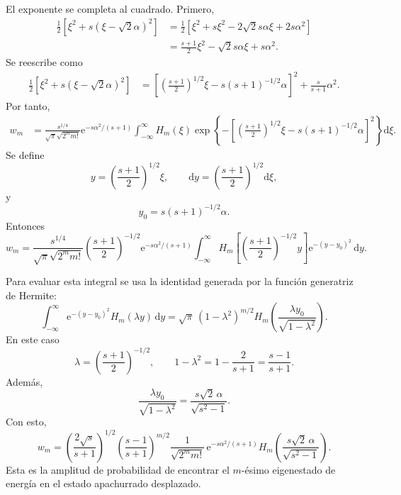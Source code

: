 \documentclass[11pt]{article}
\newcommand{\ee}{\mathrm{e}}
\newcommand{\dd}{\mathrm{d}}
\begin{document}
El exponente se completa al cuadrado. Primero,
\begin{align}
  \frac12\left[\xi^2+s(\xi-\sqrt2\alpha)^2\right]
  &=
  \frac12\left[\xi^2+s\xi^2-2\sqrt2s\alpha\xi+2s\alpha^2\right]\\
  &=
  \frac{s+1}{2}\xi^2-\sqrt2s\alpha\xi+s\alpha^2.
\end{align}
Se reescribe como
\begin{align}
  \frac12\left[\xi^2+s(\xi-\sqrt2\alpha)^2\right]
  &=
  \left[
  \left(\frac{s+1}{2}\right)^{1/2}\xi
  -s(s+1)^{-1/2}\alpha
  \right]^2
  +\frac{s}{s+1}\alpha^2.
\end{align}
Por tanto,
\begin{align}
  w_m
  &=
  \frac{s^{1/4}}{\sqrt{\pi}\sqrt{2^m m!}}
  \ee^{-s\alpha^2/(s+1)}
  \int_{-\infty}^{\infty}
  H_m(\xi)
  \exp\left\{
  -\left[
  \left(\frac{s+1}{2}\right)^{1/2}\xi
  -s(s+1)^{-1/2}\alpha
  \right]^2
  \right\}\dd \xi.
\end{align}
Se define
\begin{equation}
  y=\left(\frac{s+1}{2}\right)^{1/2}\xi,
  \qquad
  \dd y=\left(\frac{s+1}{2}\right)^{1/2}\dd \xi,
\end{equation}
y
\begin{equation}
  y_0=s(s+1)^{-1/2}\alpha.
\end{equation}
Entonces
\begin{equation}
  w_m
  =
  \frac{s^{1/4}}{\sqrt{\pi}\sqrt{2^m m!}}
  \left(\frac{s+1}{2}\right)^{-1/2}
  \ee^{-s\alpha^2/(s+1)}
  \int_{-\infty}^{\infty}
  H_m\left[
  \left(\frac{s+1}{2}\right)^{-1/2}y
  \right]
  \ee^{-(y-y_0)^2}\,\dd y.
\end{equation}

Para evaluar esta integral se usa la identidad generada por la funci\'on
generatriz de Hermite:
\begin{equation}
  \int_{-\infty}^{\infty}
  \ee^{-(y-y_0)^2}H_m(\lambda y)\,\dd y
  =
  \sqrt{\pi}\,(1-\lambda^2)^{m/2}
  H_m\left(\frac{\lambda y_0}{\sqrt{1-\lambda^2}}\right).
\end{equation}
En este caso
\begin{equation}
  \lambda=
  \left(\frac{s+1}{2}\right)^{-1/2},
  \qquad
  1-\lambda^2
  =
  1-\frac{2}{s+1}
  =
  \frac{s-1}{s+1}.
\end{equation}
Adem\'as,
\begin{equation}
  \frac{\lambda y_0}{\sqrt{1-\lambda^2}}
  =
  \frac{s\sqrt2\,\alpha}{\sqrt{s^2-1}}.
\end{equation}
Con esto,
\begin{equation}
  \boxed{
  w_m
  =
  \left(\frac{2\sqrt{s}}{s+1}\right)^{1/2}
  \left(\frac{s-1}{s+1}\right)^{m/2}
  \frac{1}{\sqrt{2^m m!}}\,
  \ee^{-s\alpha^2/(s+1)}
  H_m\left(
  \frac{s\sqrt2\,\alpha}{\sqrt{s^2-1}}
  \right).
  }
\end{equation}
Esta es la amplitud de probabilidad de encontrar el $m$-\'esimo eigenestado de
energ\'ia en el estado apachurrado desplazado.
\end{document}
